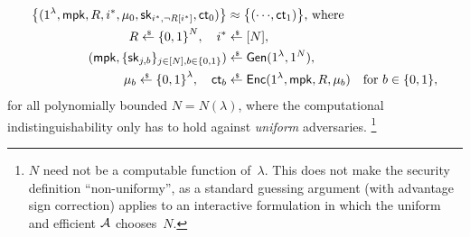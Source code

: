 \begin{definition}
\begin{align*}
\bigl\{(1^\lambda,\mpk,R,i^\ast,\mu_0,\sk_{i^\ast,\neg R[i^\ast]},\ct_0)\bigr\}
&{}\approx
\bigl\{({\cdots},\ct_1)\bigr\}
\textup{, where}\\
R\draws\bit^N,\quad
i^\ast&{}\draws[N],\\
(\mpk,\{\sk_{j,b}\}_{j\in[N],b\in\bit})
&{}\draws\Gen(1^\lambda,1^N),\\
\mu_b\draws\bit^\lambda,\quad
\ct_b&{}\draws\Enc(1^\lambda,\mpk,R,\mu_b)
\quad\textup{for }b\in\bit,
\end{align*}
for all polynomially bounded ${N=N(\lambda)}$,
where the computational indistinguishability only has to hold against \emph{uniform} adversaries.%
\footnote{$N$ need not be a computable function of~$\lambda$.
This does not make the security definition ``non-uniformy'',
as a standard guessing argument (with advantage sign correction) applies to an interactive formulation
in which the uniform and efficient ${\mathcal{A}}$ chooses~$N$.}
\end{definition}
